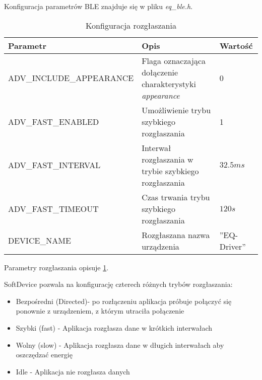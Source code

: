 Konfiguracja parametrów BLE znajduje się w pliku \emph{eq\_ble.h}.

\begin{table}[t]

\begin{tabularx}{\linewidth}{|l|X|l|}

\hline Parametr & Opis & Wartość \\

\hline ADV\_INCLUDE\_APPEARANCE & Flaga oznaczająca dołączenie charakterystyki
\emph{appearance} & 0 \\

\hline ADV\_FAST\_ENABLED & Umożliwienie trybu szybkiego rozgłaszania & 1 \\

\hline ADV\_FAST\_INTERVAL & Interwał rozgłaszania w trybie szybkiego
rozgłaszania & $32.5ms$ \\

\hline ADV\_FAST\_TIMEOUT & Czas trwania trybu szybkiego rozgłaszania & $120s$
\\

\hline DEVICE\_NAME & Rozgłaszana nazwa urządzenia & ''EQ-Driver'' \\

\hline \end{tabularx}

\caption{Konfiguracja rozgłaszania}

\label{tab:parametry-rozglaszania}

\end{table}

Parametry rozgłaszania opisuje \ref{tab:parametry-rozglaszania}.

SoftDevice pozwala na konfigurację czterech różnych trybów rozgłaszania:

\begin{itemize}

\item Bezpośredni (Directed)- po rozłączeniu aplikacja próbuje połączyć się
ponownie z urządzeniem, z którym utraciła połączenie

\item Szybki (fast) - Aplikacja rozgłasza dane w krótkich interwałach

\item Wolny (slow) - Aplikacja rozgłasza dane w długich interwałach aby
oszczędzać energię

\item Idle - Aplikacja nie rozgłasza danych

\end{itemize}

